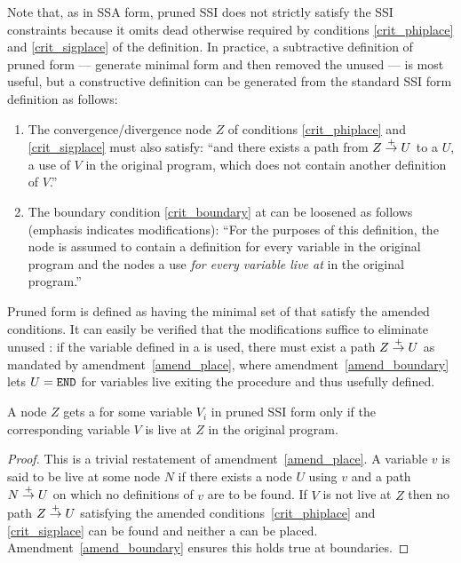 \documentclass[12pt,titlepage,twoside]{article}
\begin{document}
Note that, as in SSA form, pruned SSI
does not strictly satisfy the SSI constraints because it omits dead
 otherwise required by conditions \ref{crit_phiplace} and
\ref{crit_sigplace} of the definition.  In practice, a subtractive
definition of pruned form --- generate minimal form and then removed
the unused  --- is most useful, but a constructive
definition can be generated from the standard SSI form definition as
follows:
\begin{enumerate}
\item The convergence/divergence node $Z$ of conditions
\ref{crit_phiplace} and \ref{crit_sigplace} must also satisfy: ``and
there exists a path from $Z\stackrel{+}{\rightarrow} U$ to a $U$, a use of $V$ in the
original program, which does not contain another definition of $V$.''
  \label{amend_place}
\item The boundary condition \ref{crit_boundary} at  can be
loosened as follows (emphasis indicates modifications):
``For the purposes of this definition, the  node is
assumed to contain a definition for every variable in the original
program and the  nodes a use \emph{for every variable live
at } in the original program.''
  \label{amend_boundary}
\end{enumerate}

Pruned form is defined as having the minimal set of 
that satisfy the amended conditions.  It can easily be verified that
the modifications suffice to eliminate unused : if
the variable defined in a \phisigfunction[or]{} is used, there must
exist a path $Z\stackrel{+}{\rightarrow} U$ as mandated by amendment~\ref{amend_place},
where amendment~\ref{amend_boundary} lets $U = \texttt{END}$ for
variables live exiting the procedure and thus usefully defined.

\begin{property}\label{pty:pruned_live}
A node $Z$ gets a \phisigfunction[or]{} for some variable $V_i$ in
pruned SSI form only if the corresponding variable $V$ is live at $Z$
in the original program.
\end{property}
\begin{proof}
This is a trivial restatement of amendment~\ref{amend_place}.  A
variable $v$ is said to be live at some node $N$ if there exists
a node $U$ using $v$ and a path $N\stackrel{+}{\rightarrow} U$ on which no definitions
of $v$ are to be found.  If $V$ is not live at $Z$ then no path
$Z\stackrel{+}{\rightarrow} U$ satisfying the amended conditions~\ref{crit_phiplace}
and \ref{crit_sigplace} can be found and neither a
\phisigfunction[or]{} can be placed.  Amendment~\ref{amend_boundary}
ensures this holds true at boundaries.
\end{proof}
\end{document}
